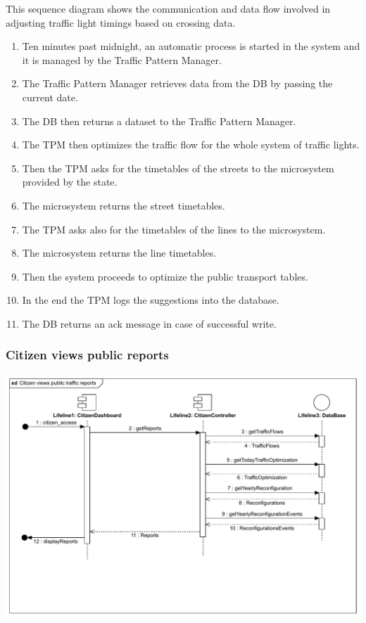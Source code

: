 \documentclass[12pt, a4paper, twoside, openright]{report}
\begin{document}
This sequence diagram shows the communication and data flow involved in
adjusting traffic light timings based on crossing data.
\begin{enumerate}
  \item Ten minutes past midnight, an automatic process is started in the system and it is managed by the Traffic Pattern Manager.
  \item The Traffic Pattern Manager retrieves data from the DB by passing the current date.
  \item	The DB then returns a dataset to the Traffic Pattern Manager.
  \item	The TPM then optimizes the traffic flow for the whole system of traffic lights.
  \item	Then the TPM asks for the timetables of the streets to the microsystem provided by the state.
  \item	The microsystem returns the street timetables.
  \item	The TPM asks also for the timetables of the lines to the microsystem.
  \item	The microsystem returns the line timetables.
  \item	Then the system proceeds to optimize the public transport tables.
  \item	In the end the TPM logs the suggestions into the database.
  \item	The DB returns an ack message in case of successful write.
\end{enumerate}


\subsubsection{Citizen views public reports}


\includegraphics[width=\linewidth]{images/svg/citizen_views_public_traffic_reports.pdf}
\end{document}
